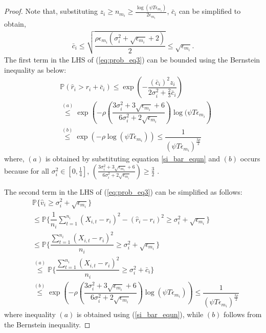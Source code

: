 \begin{proof}
Note that, substituting $ z_i \geq n_{m_i} \geq \frac{\log{(\psi T\epsilon_{m_{i}})}}{2\epsilon_{m_{i}}}$, $\bar{c}_i$ can be simplified to obtain,
\begin{align}
\bar{c}_i
\leq \sqrt{\dfrac{\rho\epsilon_{m_{i}}(\sigma_{i}^{2}+\sqrt{\epsilon_{m_{i}}} + 2)}{2}}\leq \sqrt{ \epsilon_{m_{i}}}.
\label{si_bar_equn}
\end{align}
%
The first term in the LHS of (\ref{eq:prob_eq3}) can be bounded using the Bernstein inequality as below:
\begin{align}
&\mathbb{P}\left( \hat{r}_{i} > r_{i}+ \bar{c}_i\right)\nonumber 
\le \exp\left(- \dfrac{(\bar{c}_i)^2 z_{i}}{2\sigma_i^2 + \frac{2}{3}\bar{c}_i} \right)\nonumber 
\\
& \overset{(a)}{\le} \exp\left(- \rho \left(\dfrac{3\sigma_{i}^{2}+3\sqrt{\epsilon_{m_{i}}} + 6}{6\sigma_i^2 + 2\sqrt{\epsilon_{m_i}}} \right)\log(\psi  T\epsilon_{m_{i}}\right)\nonumber \\
& \overset{(b)}{\leq} \exp\left(- \rho \log(\psi  T\epsilon_{m_{i}})\right) 
\le \dfrac{1}{(\psi  T\epsilon_{m_{i}})^{\frac{3\rho}{2}}}
\label{lhs1_equn}
\end{align}
where, $(a)$ is obtained by substituting equation \ref{si_bar_equn} and $(b)$ occurs because for all $\sigma_{i}^2 \in [0,\frac{1}{4}]$, $\left(\frac{3\sigma_{i}^{2}+3\sqrt{\epsilon_{m_{i}}} + 6}{6\sigma_i^2 + 2\sqrt{\epsilon_{m_i}}}\right) \geq \frac{3}{2}$ .

 
The second term in the LHS of (\ref{eq:prob_eq3}) can be simplified as follows:
\begin{align}
&\mathbb{P}\bigg\lbrace \hat{v}_{i}\geq \sigma_{i}^{2}+\sqrt{\epsilon_{m_{i}}}\bigg\rbrace\nonumber\\
&\leq \mathbb{P}\bigg\lbrace \dfrac{1}{n_{i}}\sum_{t=1}^{n_{i}}(X_{i,t}-r_{i})^{2}-(\hat{r}_{i}-r_{i})^{2}\geq \sigma_{i}^{2}+\sqrt{\epsilon_{m_{i}}}\bigg\rbrace\nonumber\\
&\leq \mathbb{P}\bigg\lbrace \dfrac{\sum_{t=1}^{n_{i}}(X_{i,t}-r_{i})^{2}}{n_{i}}\geq \sigma_{i}^{2}+\sqrt{\epsilon_{m_{i}}} \bigg\rbrace\nonumber\\
&\overset{(a)}{\leq} \mathbb{P}\bigg\lbrace \dfrac{\sum_{t=1}^{n_{i}}(X_{i,t}-r_{i})^{2}}{n_{i}}\geq \sigma_{i}^{2} + \bar{c}_i\bigg\rbrace \nonumber\\
&\overset{(b)}{\leq} \exp\left(- \rho \left(\dfrac{3\sigma_{i}^{2}+3\sqrt{\epsilon_{m_{i}}} + 6}{6\sigma_i^2 + 2\sqrt{\epsilon_{m_i}}} \right)\log(\psi  T\epsilon_{m_{i}})\right)
\le \dfrac{1}{(\psi  T\epsilon_{m_{i}})^{\frac{3\rho}{2}}}
\label{lhs2_equn}
\end{align}
where inequality $(a)$ is obtained using (\ref{si_bar_equn}), while $(b)$ follows from the Bernstein inequality. 


\end{proof}
